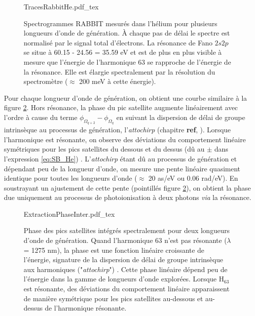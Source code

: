 \begin{figure}[!ht]
\centering
\def\svgwidth{0.70\textwidth}
{TracesRabbitHe.pdf_tex}
\caption{Spectrogrammes RABBIT mesurés dans l'hélium pour plusieurs longueurs d'onde de génération. \`{A} chaque pas de délai le spectre est normalisé par le signal total d'électrons. La résonance de Fano $2s2p$ se situe à 60.15 - 24.56 = 35.59 eV et est de plus en plus visible à mesure que l'énergie de l'harmonique 63 se rapproche de l'énergie de la résonance. Elle est élargie spectralement par la résolution du spectromètre ($\approx$ 200 meV à cette énergie).}
\label{fig:TracesRabbitHe}
\end{figure}

Pour chaque longueur d'onde de génération, on obtient une courbe similaire à la figure \ref{fig:ExtractionPhaseInter}. Hors résonance, la phase du pic satellite augmente linéairement avec l'ordre à cause du terme $\phi_{\Omega_{q+2}} - \phi_{\Omega_{q}}$ en suivant la dispersion de délai de groupe intrinsèque au processus de génération, l'\textit{attochirp} (chapitre \textbf{ref}, ). Lorsque l'harmonique est résonante, on observe des déviations du comportement linéaire symétriques pour les pics satellites du dessous et du dessus (dû au $\pm$ dans l'expression \ref{eq:SB_He}) . L'\textit{attochirp} étant dû au processus de génération et dépendant peu de la longueur d'onde, on mesure une pente linéaire quasiment identique pour toutes les longueurs d'onde ($\approx$ 20 as/eV ou 0.06 rad/eV). En soustrayant un ajustement de cette pente (pointillés figure \ref{fig:ExtractionPhaseInter}), on obtient la phase due uniquement au processus de photoionisation à deux photons \textit{via} la résonance.

\begin{figure}
\centering
\def\svgwidth{\textwidth}
{ExtractionPhaseInter.pdf_tex}
\caption{Phase des pics satellites intégrés spectralement pour deux longueurs d'onde de génération. Quand l'harmonique 63 n'est pas résonante ($\lambda$ = 1275 nm), la phase est une fonction linéaire croissante de l'énergie, signature de la dispersion de délai de groupe intrinsèque aux harmoniques ("\textit{attochirp}") . Cette phase linéaire dépend peu de l'énergie dans la gamme de longueurs d'onde explorées. Lorsque $\text{H}_{63}$ est résonante, des déviations du comportement linéaire apparaissent de manière symétrique pour les pics satellites au-dessous et au-dessus de l'harmonique résonante.}
\label{fig:ExtractionPhaseInter}
\end{figure}

